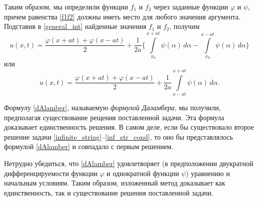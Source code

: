 Таким образом, мы определили функции $f_1$ и $f_2$ через заданные функции $\varphi$ и $\psi$, причем равенства  \eqref{f1f2} должны иметь место для любого значения аргумента. Подставив в \eqref{general_int} найденные значения $f_1$ и $f_2$, получим
\begin{equation}
	u(x, t) = \frac{\varphi(x + a t) + \varphi(x - a t)}{2} + \frac{1}{2a} \Bigg\{\int \limits_{x_0}^{x  + a t}\psi(\alpha) \, d\alpha - \int \limits_{x_0}^{x - at} \psi(\alpha) \, d\alpha \Bigg\}
\end{equation}
или 
\begin{equation} \label{dAlamber}
	u(x, t) = \frac{\varphi(x + a t) + \varphi(x - a t)}{2} + \frac{1}{2a} \int \limits_{x - a t}^{x + a t} \psi(\alpha) \, d\alpha.
\end{equation}

Формулу \eqref{dAlamber}, называемую \textit{формулой Даламбера}, мы получили, предполагая существование рещения поставленной задачи. Эта формула доказывает единственность решения. В самом деле, если бы существовало второе решение задачи \eqref{infinite_string}--\eqref{inf_str_cond}, то оно бы представлялось формулой \eqref{dAlamber} и совпадало с первым решением. 

Нетрудно убедиться, что \eqref{dAlamber} удовлетворяет (в предположении двукратной дифференцируемости функции $\varphi$ и однократной функции $\psi$) уравнению и начальным условиям. Таким образом, изложенный метод доказывает как единственность, так и существование решения поставленной задачи.